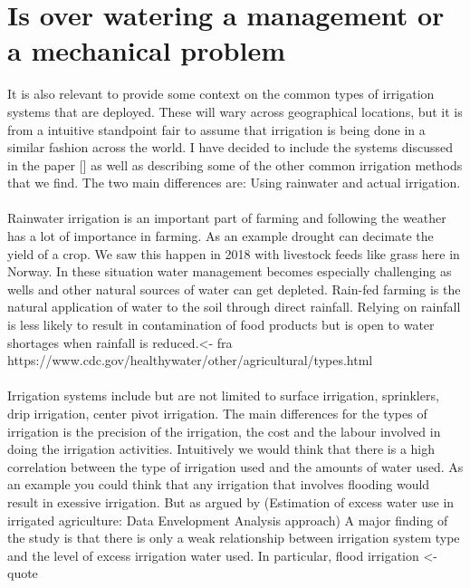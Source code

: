 \documentclass[]{uiophd}
\begin{document}
\section{Is over watering a management or a mechanical problem}

It is also relevant to provide some context on the common types of irrigation systems that are deployed. These will wary across geographical locations, but it is from a intuitive standpoint fair to assume that irrigation is being done in a similar fashion across the world. I have decided to include the systems discussed in the paper [] as well as describing some of the  other common irrigation methods that we find. The two main differences are: Using rainwater and actual irrigation. \\\\
Rainwater irrigation is an important part of farming and following the weather has a lot of importance in farming. As an example drought can decimate the yield of a crop. We saw this happen in 2018 with livestock feeds like grass here in Norway. In these situation water management becomes especially challenging as wells and other natural sources of water can get depleted. Rain-fed farming is the natural application of water to the soil through direct rainfall. Relying on rainfall is less likely to result in contamination of food products but is open to water shortages when rainfall is reduced.<- fra https://www.cdc.gov/healthywater/other/agricultural/types.html
\\\\
Irrigation systems include but are not limited to surface irrigation, sprinklers, drip irrigation, center pivot irrigation. The main differences for the types of irrigation is the precision of the irrigation, the cost and the labour involved in doing the irrigation activities. Intuitively we would think that there is a high correlation between the type of irrigation used and the amounts of water used. As an example you could think that any irrigation that involves flooding would result in exessive irrigation. But as argued by (Estimation of excess water use in irrigated agriculture: Data Envelopment Analysis approach) A major finding of the study is that there is only a weak relationship between irrigation system type and the level of excess irrigation water used. In particular, flood irrigation <-quote \\\\
\end{document}

